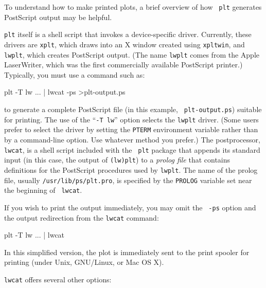 \documentclass{book}
\begin{document}
To understand how to make printed plots, a brief overview of how {\tt
plt} generates PostScript output may be helpful.

%
%
%
{\tt plt} itself is a shell script that invokes a device-specific
driver.  Currently, these drivers are {\tt xplt}, which draws
into an X window created using {\tt xpltwin}, and {\tt lwplt}, which
creates PostScript output.  (The name {\tt lwplt} comes from the Apple
LaserWriter, which was the first commercially available PostScript
printer.)  Typically, you must use a command such as:

\begin{center}
\begin{boxedverbatim}
plt -T lw ... | lwcat -ps >plt-output.ps
\end{boxedverbatim}
\end{center}
to generate a complete PostScript file (in this example, {\tt
plt-output.ps}) suitable for printing.  The use of the ``{\tt -T lw}''
option selects the {\tt lwplt} driver.  (Some users prefer to select
the driver by setting the {\tt PTERM} environment variable rather than
by a command-line option.  Use whatever method you prefer.)  The
postprocessor, {\tt lwcat}, is a shell script included with the {\tt
plt} package that appends its standard input (in this case, the
output of {\tt (lw)plt}) to a {\em prolog file} that contains
definitions for the PostScript procedures used by {\tt lwplt}.  The
name of the prolog file, usually {\tt /usr/lib/\-ps/\-plt.pro}, is
specified by the {\tt PROLOG} variable set near the beginning of {\tt
lwcat}.

If you wish to print the output immediately, you may omit the {\tt
-ps} option and the output redirection from the {\tt lwcat} command:

\begin{center}
\begin{boxedverbatim}
plt -T lw ... | lwcat
\end{boxedverbatim}
\end{center}

%
%
%
%
In this simplified version, the plot is immediately sent to the print
spooler for printing (under Unix, GNU/Linux, or Mac OS X).

%
{\tt lwcat} offers several other options:
\end{document}
